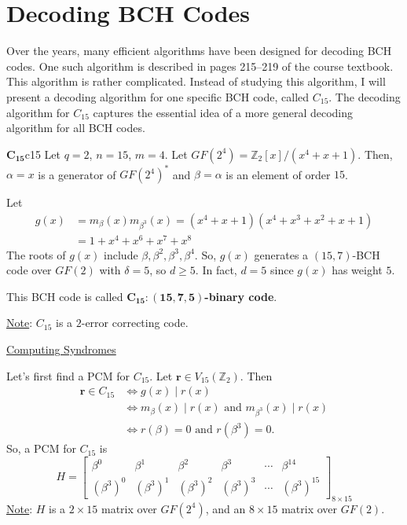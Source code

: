 \section{Decoding BCH Codes}
Over the years, many efficient algorithms have been designed for decoding
BCH codes. One such algorithm is described in pages 215--219 of the
course textbook. This algorithm is rather complicated. Instead of studying
this algorithm, I will present a decoding algorithm for one specific
BCH code, called $ C_{15} $. The decoding algorithm for $ C_{15} $
captures the essential idea of a more general decoding algorithm for all
BCH codes.


\begin{Definition}{$ \bm{C_{15}} $}{c15}
    Let $ q=2 $, $ n=15 $, $ m=4 $. Let $ GF(2^4)=\mathbb{Z}_2[x]/(x^4+x+1) $.
    Then, $ \alpha=x $ is a generator of $ GF(2^4)^* $ and $ \beta=\alpha $
    is an element of order $ 15 $.

    Let
    \begin{align*}
        g(x)
         & =m_{\beta}(x)m_{\beta^3}(x)=(x^4+x+1)(x^4+x^3+x^2+x+1) \\
         & =1+x^4+x^6+x^7+x^8
    \end{align*}
    The roots of $ g(x) $ include $ \beta,\beta^2,\beta^3,\beta^4 $. So,
    $ g(x) $ generates a $ (15,7) $-BCH code over $ GF(2) $
    with $ \delta=5 $, so $ d\geqslant 5 $. In fact, $ d=5 $
    since $ g(x) $ has weight $ 5 $.

    This BCH code is called \textbf{$ \bm{C_{15}:(15,7,5)} $-binary code}.

    \underline{Note}: $ C_{15} $ is a $ 2 $-error correcting code.
\end{Definition}


\underline{Computing Syndromes}

Let's first find a PCM for $ C_{15} $. Let $ \bm{r}\in V_{15}(\mathbb{Z}_2) $.
Then
\begin{align*}
    \bm{r}\in C_{15}
     & \iff g(x)\mid r(x)                                            \\
     & \iff m_{\beta}(x)\mid r(x)\text{ and }m_{\beta^3}(x)\mid r(x) \\
     & \iff r(\beta)=0\text{ and } r(\beta^3)=0.
\end{align*}
So, a PCM for $ C_{15} $ is
\[ H=
    \begin{bmatrix}
        \beta^0     & \beta^1     & \beta^2     & \beta^3     & \cdots & \beta^{14}     \\
        (\beta^3)^0 & (\beta^3)^1 & (\beta^3)^2 & (\beta^3)^3 & \cdots & (\beta^3)^{15}
    \end{bmatrix}_{8\times 15} \]
\underline{Note}: $ H $ is a $ 2\times 15 $ matrix over $ GF(2^4) $,
and an $ 8\times 15 $ matrix over $ GF(2) $.

